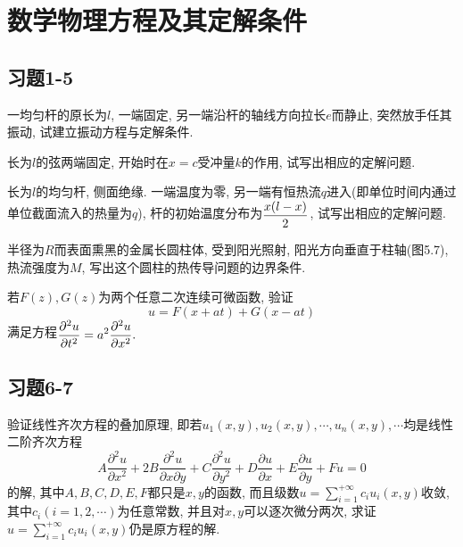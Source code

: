 

\chapter{数学物理方程及其定解条件}

\section{习题1-5}

\begin{yyEx}
	一均匀杆的原长为$l$, 一端固定, 另一端沿杆的轴线方向拉长$e$而静止, 突然放手任其振动, 试建立振动方程与定解条件.
\end{yyEx}

\begin{yyEx}
	长为$l$的弦两端固定, 开始时在$x = c$受冲量$k$的作用, 试写出相应的定解问题.
\end{yyEx}

\begin{yyEx}
	长为$l$的均匀杆, 侧面绝缘. 一端温度为零, 另一端有恒热流$q$进入(即单位时间内通过单位截面流入的热量为$q$), 杆的初始温度分布为$\begin{lgathered}\frac{x(l-x)}{2}\end{lgathered}$, 试写出相应的定解问题.
\end{yyEx}

\begin{yyEx}
	半径为$R$而表面熏黑的金属长圆柱体, 受到阳光照射, 阳光方向垂直于柱轴(图5.7), 热流强度为$M$, 写出这个圆柱的热传导问题的边界条件.
\end{yyEx}

\begin{yyEx}
	若$F(z),G(z)$为两个任意二次连续可微函数, 验证\begin{equation*}
		u = F(x+at)+G(x-at)
	\end{equation*}
	满足方程$\begin{lgathered}
		\frac{\partial^2 u}{\partial t^2} = a^2\frac{\partial^2 u}{\partial x^2}.
	\end{lgathered}$
\end{yyEx}

\section{习题6-7}

\begin{yyEx}
	验证线性齐次方程的叠加原理, 即若$u_1(x,y),u_2(x,y),\cdots,u_n(x,y),\cdots$均是线性二阶齐次方程
	\begin{equation*}
		A\frac{\partial^2 u}{\partial x^2} + 2B\frac{\partial^2 u}{\partial x\partial y} + C\frac{\partial^2 u}{\partial y^2} + D\frac{\partial u}{\partial x} + E\frac{\partial u}{\partial y} + Fu = 0
	\end{equation*}
	的解, 其中$A,B,C,D,E,F$都只是$x,y$的函数, 而且级数$u = \sum\limits_{i = 1}^{+\infty}c_iu_i(x,y)$收敛, 其中$c_i(i=1,2,\cdots)$为任意常数, 并且对$x,y$可以逐次微分两次, 求证$u = \sum\limits_{i = 1}^{+\infty}c_iu_i(x,y)$仍是原方程的解.
\end{yyEx}

